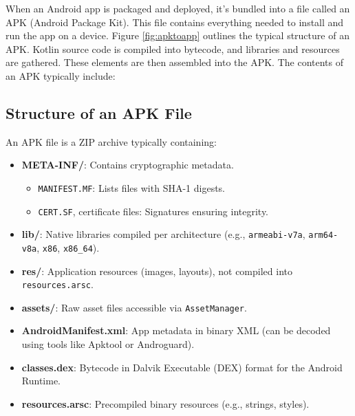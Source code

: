 When an Android app is packaged and deployed, it’s bundled into a file called an APK (Android Package Kit). This file contains everything needed to install and run the app on a device. Figure \ref{fig:apktoapp} outlines the typical structure of an APK.
Kotlin source code is compiled into bytecode, and libraries and resources are gathered. These elements are then assembled into the APK. The contents of an APK typically include:
\subsection{Structure of an APK File}

An APK file is a ZIP archive typically containing:

\begin{itemize}
  \item \textbf{META-INF/}: Contains cryptographic metadata.
  \begin{itemize}
    \item \texttt{MANIFEST.MF}: Lists files with SHA-1 digests.
    \item \texttt{CERT.SF}, certificate files: Signatures ensuring integrity.
  \end{itemize}
  \item \textbf{lib/}: Native libraries compiled per architecture (e.g., \texttt{armeabi-v7a}, \texttt{arm64-v8a}, \texttt{x86}, \texttt{x86\_64}).
  \item \textbf{res/}: Application resources (images, layouts), not compiled into \texttt{resources.arsc}.
  \item \textbf{assets/}: Raw asset files accessible via \texttt{AssetManager}.
  \item \textbf{AndroidManifest.xml}: App metadata in binary XML (can be decoded using tools like Apktool or Androguard).
  \item \textbf{classes.dex}: Bytecode in Dalvik Executable (DEX) format for the Android Runtime.
  \item \textbf{resources.arsc}: Precompiled binary resources (e.g., strings, styles).
\end{itemize}

